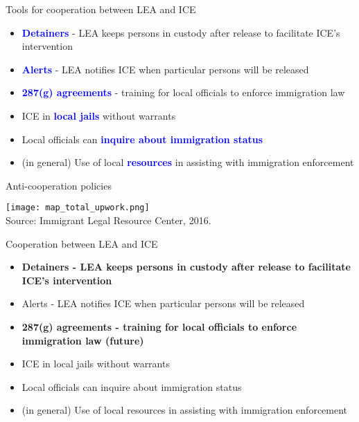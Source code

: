 \documentclass[xcolor=pdftex,dvipsnames,table]{beamer}
\begin{document}
\begin{frame}{Tools for cooperation between LEA and ICE}
\begin{itemize}
\item \textbf{\textcolor{Blue}{Detainers}} - LEA keeps persons in custody after release to facilitate ICE's intervention
\item \textbf{\textcolor{Blue}{Alerts}} - LEA notifies ICE when particular persons will be released
\item \textbf{\textcolor{Blue}{287(g) agreements}} - training for local officials to enforce immigration law
\item ICE in \textbf{\textcolor{Blue}{local jails}} without warrants
\item Local officials can \textbf{\textcolor{Blue}{inquire about immigration status}}
\item (in general) Use of local \textbf{\textcolor{Blue}{resources}} in assisting with immigration enforcement
\end{itemize}
\end{frame}

\begin{frame}{Anti-cooperation policies}
\begin{center}
\texttt{[image: map\_total\_upwork.png]}
\\\tiny{Source: Immigrant Legal Resource Center, 2016.}
\end{center}
\end{frame}

\begin{frame}{Cooperation between LEA and ICE}
\begin{itemize}
\item \textbf{Detainers - LEA keeps persons in custody after release to facilitate ICE's intervention}
\item Alerts - LEA notifies ICE when particular persons will be released
\item \textbf{287(g) agreements - training for local officials to enforce immigration law (future)}
\item ICE in local jails without warrants
\item Local officials can inquire about immigration status
\item (in general)  Use of local resources in assisting with immigration enforcement
\end{itemize}
\end{frame}
\end{document}
